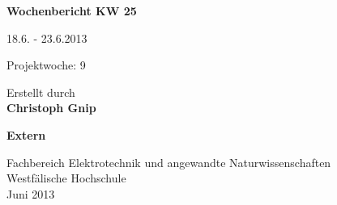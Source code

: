 
\begin{center}
{\Huge \textbf{Wochenbericht KW 25}\par}
\vspace{1cm}
{\Huge 18.6. - 23.6.2013\par}
\vspace{1cm}
{\Huge Projektwoche: 9\par}

\vspace{2cm}

\large{Erstellt durch}\\
\Large{\textbf{Christoph Gnip}}


\vspace{4cm}

\Large{\textbf{Extern}}

\vfill

{\normalsize Fachbereich Elektrotechnik und angewandte Naturwissenschaften\\
Westfälische Hochschule\\[2ex]Juni 2013}


\end{center}
\newpage